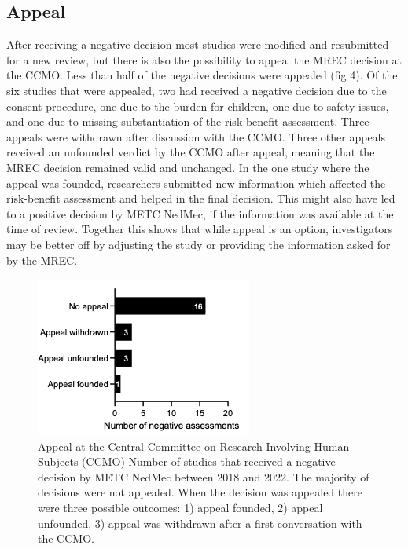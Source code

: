 \documentclass[authordate, empirical]{jote-new-article}
\begin{document}
	\subsection{Appeal}



	After receiving a negative decision most studies were modified and resubmitted for a new review, but there is also the possibility to appeal the MREC decision at the CCMO. Less than half of the negative decisions were appealed (fig 4). Of the six studies that were appealed, two had received a negative decision due to the consent procedure, one due to the burden for children, one due to safety issues, and one due to missing substantiation of the risk-benefit assessment. Three appeals were withdrawn after discussion with the CCMO. Three other appeals received an unfounded verdict by the CCMO after appeal, meaning that the MREC decision remained valid and unchanged. In the one study where the appeal was founded, researchers submitted new information which affected the risk-benefit assessment and helped in the final decision. This might also have led to a positive decision by METC NedMec, if the information was available at the time of review. Together this shows that while appeal is an option, investigators may be better off by adjusting the study or providing the information asked for by the MREC.



	\begin{figure}
	
		\includegraphics[width=\linewidth]{media/Picture4.png}

		\caption{Appeal at the Central Committee on Research Involving Human Subjects (CCMO) 
		Number of studies that received a negative decision by METC NedMec between 2018 and 2022. The majority of decisions were not appealed. When the decision was appealed there were three possible outcomes: 1) appeal founded, 2) appeal unfounded, 3) appeal was withdrawn after a first conversation with the CCMO.}

		\label{fig:rId14}
	
	\end{figure}
\end{document}
